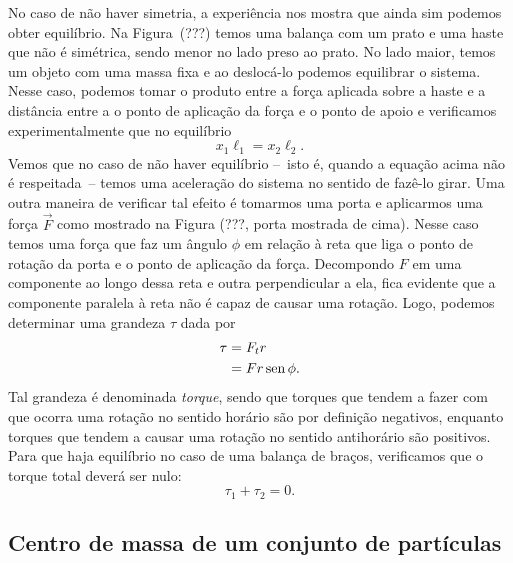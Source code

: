 No caso de não haver simetria, a experiência nos mostra que ainda sim podemos obter equilíbrio. Na Figura~(???) temos uma balança com um prato e uma haste que não é simétrica, sendo menor no lado preso ao prato. No lado maior, temos um objeto com uma massa fixa e ao deslocá-lo podemos equilibrar o sistema. Nesse caso, podemos tomar o produto entre a força aplicada sobre a haste e a distância entre a o ponto de aplicação da força e o ponto de apoio e verificamos experimentalmente que no equilíbrio
\begin{equation}
  x_1 \ell_1 = x_2 \ell_2.
\end{equation}
%
Vemos que no caso de não haver equilíbrio --~isto é, quando a equação acima não é respeitada~-- temos uma aceleração do sistema no sentido de fazê-lo girar. Uma outra maneira de verificar tal efeito é tomarmos uma porta e aplicarmos uma força $\vec{F}$ como mostrado na Figura (???, porta mostrada de cima). Nesse caso temos uma força que faz um ângulo $\phi$ em relação à reta que liga o ponto de rotação da porta e o ponto de aplicação da força. Decompondo $F$ em uma componente ao longo dessa reta e outra perpendicular a ela, fica evidente que a componente paralela à reta não é capaz de causar uma rotação. Logo, podemos determinar uma grandeza $\tau$ dada por
\begin{align}
  \tau &= F_t r \\
  &= F r \operatorname{sen} \phi.
\end{align}
%
Tal grandeza é denominada \emph{torque}, sendo que torques que tendem a fazer com que ocorra uma rotação no sentido horário são por definição negativos, enquanto torques que tendem a causar uma rotação no sentido antihorário são positivos. Para que haja equilíbrio no caso de uma balança de braços, verificamos que o torque total deverá ser nulo:
\begin{equation}
  \tau_1 + \tau_2 = 0.
\end{equation}

\subsection{Centro de massa de um conjunto de partículas}

